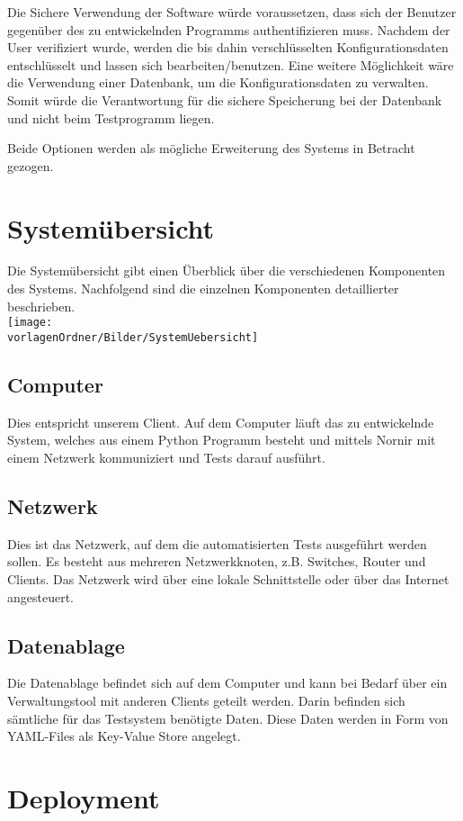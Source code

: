 \documentclass[
	ngerman,
	toc=listof, %
	toc=bibliography, %
	footnotes=multiple, %
	parskip=half, %
	numbers=noendperiod %
]{scrartcl}
\newcommand{\vorlagenOrdner}{../../99_Vorlagen} %
\begin{document}
		Die Sichere Verwendung der Software würde voraussetzen, dass sich der Benutzer gegenüber des zu entwickelnden Programms authentifizieren muss.
		Nachdem der User verifiziert wurde, werden die bis dahin verschlüsselten Konfigurationsdaten entschlüsselt und lassen sich bearbeiten/benutzen.
		Eine weitere Möglichkeit wäre die Verwendung einer Datenbank, um die Konfigurationsdaten zu verwalten. 
		Somit würde die Verantwortung für die sichere Speicherung bei der Datenbank und nicht beim Testprogramm liegen.

		Beide Optionen werden als mögliche Erweiterung des Systems in Betracht gezogen.

\section{Systemübersicht}
	Die Systemübersicht gibt einen Überblick über die verschiedenen Komponenten des Systems. Nachfolgend sind die einzelnen Komponenten detaillierter beschrieben.\\
	\texttt{[image: \\vorlagenOrdner/Bilder/SystemUebersicht]}

	\subsection{Computer}
		Dies entspricht unserem Client.
		Auf dem Computer läuft das zu entwickelnde System, welches aus einem Python Programm besteht und mittels Nornir mit einem Netzwerk kommuniziert und Tests darauf ausführt.

	\subsection{Netzwerk}
		Dies ist das Netzwerk, auf dem die automatisierten Tests ausgeführt werden sollen. 
		Es besteht aus mehreren Netzwerkknoten, z.B. Switches, Router und Clients.
		Das Netzwerk wird über eine lokale Schnittstelle oder über das Internet angesteuert.

	\subsection{Datenablage}
		Die Datenablage befindet sich auf dem Computer und kann bei Bedarf über ein Verwaltungstool mit anderen Clients geteilt werden. 
		Darin befinden sich sämtliche für das Testsystem benötigte Daten.
		Diese Daten werden in Form von YAML-Files als Key-Value Store angelegt.

\section{Deployment}
\end{document}

